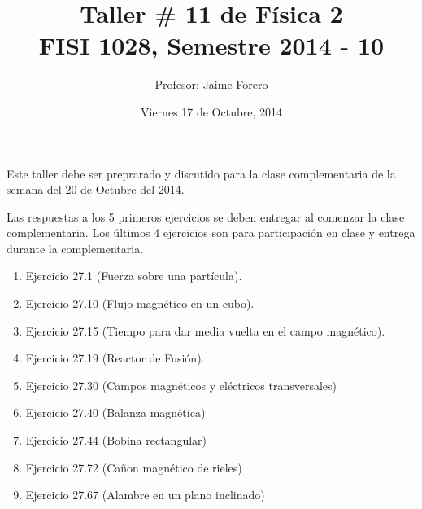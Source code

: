 \documentclass{article}
\title{Taller \# 11 de F\'isica 2\\ FISI 1028, Semestre 2014 - 10}
\author{Profesor: Jaime Forero}
\date{Viernes 17 de Octubre, 2014}
\begin{document}
\maketitle
\thispagestyle{empty}

\noindent


Este taller debe ser preprarado y discutido para la clase
complementaria de la semana del 20 de Octubre del 2014.


Las respuestas a los 5 primeros ejercicios se deben entregar al comenzar la
clase complementaria. Los \'ultimos 4 ejercicios son para
participaci\'on en clase y entrega durante la complementaria. 

\begin{enumerate}

\item
Ejercicio 27.1 (Fuerza sobre una part\'icula).

\item
Ejercicio 27.10 (Flujo magn\'etico en un cubo).

\item 
Ejercicio 27.15 (Tiempo para dar media vuelta en el campo magn\'etico).

\item 
Ejercicio 27.19 (Reactor de Fusi\'on).

\item
Ejercicio 27.30 (Campos magn\'eticos y el\'ectricos transversales)

\item 
Ejercicio 27.40 (Balanza magn\'etica)

\item
Ejercicio 27.44 (Bobina rectangular)

\item
Ejercicio 27.72 (Cañon magn\'etico de rieles)

\item
Ejercicio 27.67 (Alambre en un plano inclinado)

\end{enumerate}
\end{document}

